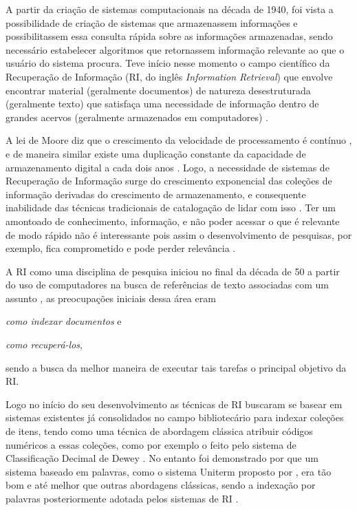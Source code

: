     
    
    A partir da criação de sistemas computacionais na década de 1940, foi vista a possibilidade de criação de sistemas que armazenassem informações e possibilitassem essa consulta rápida sobre as informações armazenadas, sendo necessário estabelecer algoritmos que retornassem informação relevante ao que o usuário do sistema procura. 
    Teve início nesse momento o campo científico da Recuperação de Informação (RI, do inglês \textit{Information Retrieval}) que envolve encontrar material (geralmente documentos) de natureza desestruturada (geralmente texto) que satisfaça uma necessidade de informação dentro de grandes acervos (geralmente armazenados em computadores) \cite[p.~1]{Manning2008IIR}.
    
    A lei de Moore diz que o crescimento da velocidade de processamento é contínuo \cite{Moore1975}, e de maneira similar existe uma duplicação constante da capacidade de armazenamento digital a cada dois anos \cite{Kryder2005}. 
    Logo, a necessidade de sistemas de Recuperação de Informação surge do crescimento exponencial das coleções de informação derivadas do crescimento de armazenamento, e consequente inabilidade das técnicas tradicionais de catalogação de lidar com isso \cite{Sanderson2012THIRR}.
    Ter um amontoado de conhecimento, informação, e não poder acessar o que é relevante de modo rápido não é interessante pois assim o desenvolvimento de pesquisas, por exemplo, fica comprometido e pode perder relevância \cite{Bush:1979:WMT:1113634.1113638}.
    
    A RI como uma disciplina de pesquisa iniciou no final da década de 50 a partir do uso de computadores na busca de referências de texto associadas com um assunto \cite[p.~3]{Sanderson2012THIRR}, as preocupações iniciais dessa área eram 
    \begin{enumerate*}[label=(\alph*)]
    \item \textit{como indexar documentos} e \item \textit{como recuperá-los},
    \end{enumerate*}
    sendo a busca da melhor maneira de executar tais tarefas o principal objetivo da RI.
    
    Logo no início do seu desenvolvimento as técnicas de RI buscaram se basear em sistemas existentes já consolidados no campo bibliotecário para indexar coleções de itens, tendo como uma técnica de abordagem clássica atribuir códigos numéricos a essas coleções, como por exemplo o feito pelo sistema de Classificação Decimal de Dewey \cite[p.~1446]{Sanderson2012THIRR}.
    No entanto foi demonstrado por  que um sistema baseado em palavras, como o sistema Uniterm proposto por , era tão bom e até melhor que outras abordagens clássicas, sendo a indexação por palavras posteriormente adotada pelos sistemas de RI \cite[p.~1446]{Sanderson2012THIRR}.
    
